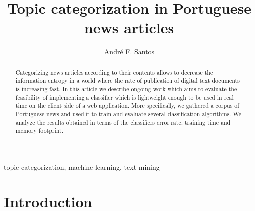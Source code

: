 \documentclass[runningheads,a4paper]{llncs}[2015/06/24]
\begin{document}
\title{Topic categorization in Portuguese news articles}

\author{André F. Santos}


%
%

\maketitle

\begin{abstract}
Categorizing news articles according to their contents allows to
decrease the information entropy in a world where the rate of
publication of digital text documents is increasing fast. In this
article we describe ongoing work which aims to evaluate the
feasibility of implementing a classifier which is lightweight
enough to be used in real time on the client side of a web
application.  More specifically, we gathered a corpus of Portuguese
news and used it to train and evaluate several classification
algorithms. We analyze the results obtained in terms of the
classifiers error rate, training time and memory footprint.
\end{abstract}

\begin{keywords}
topic categorization, machine learning, text mining
\end{keywords}

\section{Introduction}\label{sec:intro}
\end{document}
